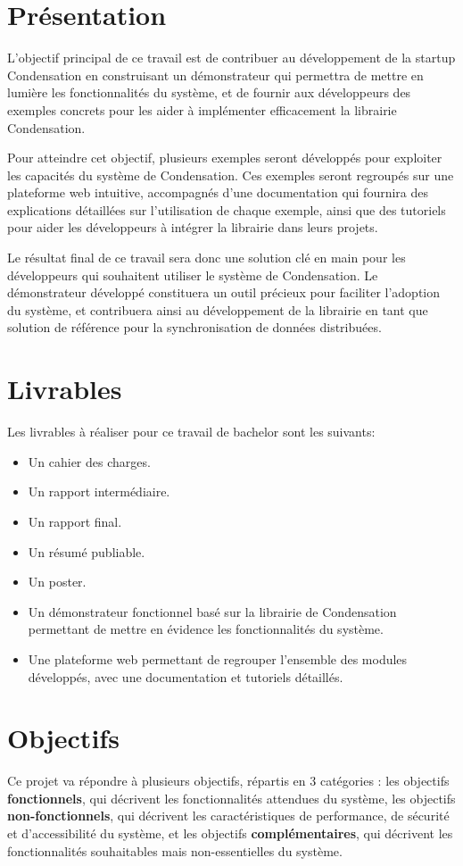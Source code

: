 \section*{Présentation}
L'objectif principal de ce travail est de contribuer au développement de la startup Condensation en construisant un démonstrateur qui permettra de mettre en lumière les fonctionnalités du système, et de fournir aux développeurs des exemples concrets pour les aider à implémenter efficacement la librairie Condensation.

Pour atteindre cet objectif, plusieurs exemples seront développés pour exploiter les capacités du système de Condensation. Ces exemples seront regroupés sur une plateforme web intuitive, accompagnés d'une documentation qui fournira des explications détaillées sur l'utilisation de chaque exemple, ainsi que des tutoriels pour aider les développeurs à intégrer la librairie dans leurs projets.

Le résultat final de ce travail sera donc une solution clé en main pour les développeurs qui souhaitent utiliser le système de Condensation. Le démonstrateur développé constituera un outil précieux pour faciliter l'adoption du système, et contribuera ainsi au développement de la librairie en tant que solution de référence pour la synchronisation de données distribuées.

\section*{Livrables}
Les livrables à réaliser pour ce travail de bachelor sont les suivants:

\begin{itemize}
    \item Un cahier des charges.
    \item Un rapport intermédiaire.
    \item Un rapport final.
    \item Un résumé publiable.
    \item Un poster.
    \item Un démonstrateur fonctionnel basé sur la librairie de Condensation permettant de mettre en évidence les fonctionnalités du système.
    \item Une plateforme web permettant de regrouper l'ensemble des modules développés, avec une documentation et tutoriels détaillés.
\end{itemize}

\section*{Objectifs}
Ce projet va répondre à plusieurs objectifs, répartis en 3 catégories : les objectifs \textbf{fonctionnels}, qui décrivent les fonctionnalités attendues du système, les objectifs \textbf{non-fonctionnels}, qui décrivent les caractéristiques de performance, de sécurité et d'accessibilité du système, et les objectifs \textbf{complémentaires}, qui décrivent les fonctionnalités souhaitables mais non-essentielles du système.

